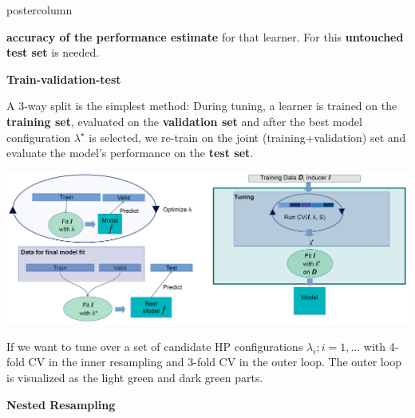 \documentclass{beamer}
\begin{document}
\begin{frame}[fragile]{}
\begin{columns}
  \begin{column}{.31\textwidth}
\begin{beamercolorbox}[center]{postercolumn}
\begin{minipage}{.98\textwidth}
\parbox[t][\columnheight]{\textwidth}{
  \begin{myblock}{}
  \textbf{accuracy of the performance estimate} for that learner. For this \textbf{untouched test set} is needed.
  \begin{codebox} \textbf{Train-validation-test}	\end{codebox}
  A 3-way split is the simplest method:
    During tuning, a learner is trained on the \textbf{training set}, evaluated on the  \textbf{validation set} and after the best model configuration $\lambda^\star$ is selected, we re-train on the joint (training+validation) set and evaluate the model's performance on the \textbf{test set}.\\

\begin{center}
             \includegraphics[width=1\columnwidth]{img/tuning_1.PNG}
               \end{center}

\hspace*{1ex}

If we want to tune over a set of candidate HP configurations $\lambda_i; i = 1, \dots$ with 4-fold CV in the inner resampling and 3-fold CV in the outer loop. The outer loop is visualized as the light green and dark green parts.

 \begin{codebox} \textbf{Nested Resampling}	\end{codebox}
 

\end{myblock}}
\end{minipage}
\end{beamercolorbox}
\end{column}
\end{columns}
\end{frame}
\end{document}
